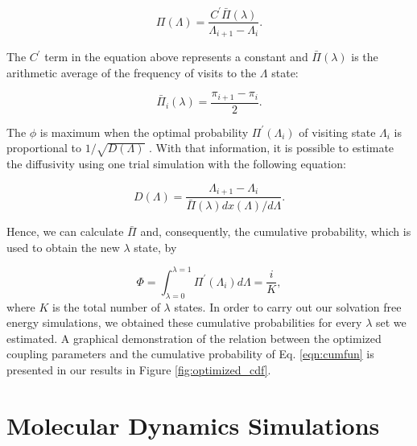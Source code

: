 \documentclass[final,12p,times,twocolumn]{elsarticle}
\begin{document}
	\begin{equation}
	\Pi (\Lambda) = \dfrac{C^{'} \bar{\Pi} (\lambda)}{\Lambda_{i+1} - \Lambda_{i}}.
	\label{eqn:plambda}
	\end{equation}
	
	The $C^{'} $ term in the equation above represents a constant and $\bar{\Pi} (\lambda)$ is the arithmetic average of the frequency of visits to the $\Lambda$ state:
	
	\begin{equation}
	\bar{\Pi}_{i} (\lambda) = \dfrac{\pi_{i+1} - \pi_{i}}{2}.
	\label{eqn:barplambda}
	\end{equation}
	
	The $\phi$ is maximum when the optimal probability $\Pi^{'}(\Lambda_{i})$ of visiting state $\Lambda_{i}$ is proportional to $1/\sqrt{D(\Lambda)}$ \cite{trebst2004}. With that information, it is possible to estimate the diffusivity using one trial simulation with the following equation:
	
	\begin{equation}
	D(\Lambda) = \dfrac{\Lambda_{i+1} - \Lambda_{i}}{\bar{\Pi} (\lambda) {dx(\Lambda)}/{d \Lambda}}.
	\label{eqn:diff}
	\end{equation}
	
	Hence, we can calculate $\bar{\Pi} $ and, consequently, the cumulative probability, which is used to obtain the new $\lambda$ state, by
	
	\begin{equation}
	\Phi = \int_{\lambda =0}^{\lambda =1} \Pi^{'}(\Lambda_{i}) d \Lambda = \dfrac{i}{K},
	\label{eqn:cumfun}
	\end{equation}
	where $K$ is the total number of $\lambda$ states. In order to carry out our solvation free energy simulations, we obtained these cumulative probabilities for every $\lambda$ set we estimated. A graphical demonstration of the relation between the optimized coupling parameters and the cumulative probability of Eq. \ref{eqn:cumfun} is presented in our results in Figure \ref{fig:optimized_cdf}.

	\section{Molecular Dynamics Simulations}\label{mds}
	
\end{document}
